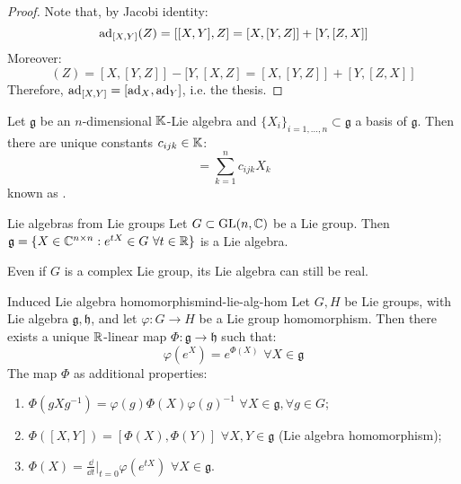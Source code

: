\begin{proofbox}
  \begin{proof}
    Note that, by Jacobi identity:
    \begin{equation*}
      \operatorname{ad}_{[X,Y]}(Z) = [[X,Y],Z] = [X,[Y,Z]] + [Y,[Z,X]]
    \end{equation*}
    Moreover:
    \begin{equation*}
      [\ad_X,\ad_Y](Z) = [X,[Y,Z]] - [Y,[X,Z] = [X,[Y,Z]] + [Y,[Z,X]]
    \end{equation*}
    Therefore, $ \operatorname{ad}_{[X,Y]} = [\operatorname{ad}_X,\operatorname{ad}_Y] $, i.e. the thesis.
  \end{proof}
\end{proofbox}

Let $ \mathfrak{g} $ be an $ n $-dimensional $ \mathbb{K} $-Lie algebra and $ \{X_i\}_{i = 1,\dots,n} \subset \mathfrak{g} $ a basis of $ \mathfrak{g} $. Then there are unique constants $ c_{ijk} \in \mathbb{K} $:
\begin{equation*}
  [X_i , X_j] = \sum_{k = 1}^{n} c_{ijk} X_k
\end{equation*}
known as .

\begin{theorem}{Lie algebras from Lie groups}{}
  Let $ G \subset \mathrm{GL}(n,\mathbb{C}) $ be a Lie group. Then $ \mathfrak{g} = \{X \in \mathbb{C}^{n \times n} : e^{t X} \in G \,\,\forall t \in \mathbb{R} \} $ is a Lie algebra.
\end{theorem}

Even if $ G $ is a complex Lie group, its Lie algebra can still be real.

\begin{theorem}{Induced Lie algebra homomorphism}{ind-lie-alg-hom}
  Let $ G,H $ be Lie groups, with Lie algebra $ \mathfrak{g},\mathfrak{h} $, and let $ \varphi : G \rightarrow H $ be a Lie group homomorphism. Then there exists a unique $ \mathbb{R} $-linear map $ \Phi : \mathfrak{g} \rightarrow \mathfrak{h} $ such that:
  \begin{equation*}
    \varphi(e^X) = e^{\Phi(X)} \,\,\forall X \in \mathfrak{g}
  \end{equation*}
  The map $ \Phi $ as additional properties:
  \begin{enumerate}
    \item $ \Phi(gXg^{-1}) = \varphi(g) \Phi(X) \varphi(g)^{-1} \,\,\forall X \in \mathfrak{g} , \forall g \in G $;
    \item $ \Phi([X,Y]) = [\Phi(X),\Phi(Y)] \,\,\forall X,Y \in \mathfrak{g} $ (Lie algebra homomorphism);
    \item $ \Phi(X) = \frac{\dd}{\dd t}\big\vert_{t = 0} \varphi(e^{tX}) \,\,\forall X \in \mathfrak{g} $.
  \end{enumerate}
\end{theorem}

